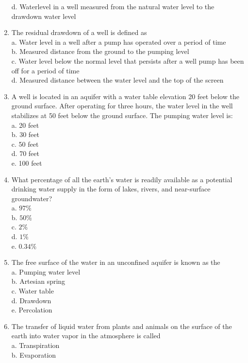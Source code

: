 \begin{enumerate}
d. Waterlevel in a well measured from the natural water level to the drawdown water level\\
\item The residual drawdown of a well is defined as\\
a. Water level in a well after a pump has operated over a period of time\\
b. Measured distance from the ground to the pumping level\\
c. Water level below the normal level that persists after a well pump has been off for a period of time\\
d. Measured distance between the water level and the top of the screen\\
\item A well is located in an aquifer with a water table elevation 20 feet below the ground surface. After operating for three hours, the water level in the well stabilizes at 50 feet below the ground surface. The pumping water level is:\\
a. 20 feet\\
b. 30 feet\\
c. 50 feet\\
d. 70 feet\\
e. 100 feet\\
\item What percentage of all the earth's water is readily available as a potential drinking water supply in the form of lakes, rivers, and near-surface groundwater?\\
a. $97 \%$\\
b. $50 \%$\\
c. $2 \%$\\
d. $1 \%$\\
e. $0.34 \%$\\
\item The free surface of the water in an unconfined aquifer is known as the\\
a. Pumping water level\\
b. Artesian spring\\
c. Water table\\
d. Drawdown\\
e. Percolation\\
\item The transfer of liquid water from plants and animals on the surface of the earth into water vapor in the atmosphere is called\\
a. Transpiration\\
b. Evaporation\\

\end{enumerate}
